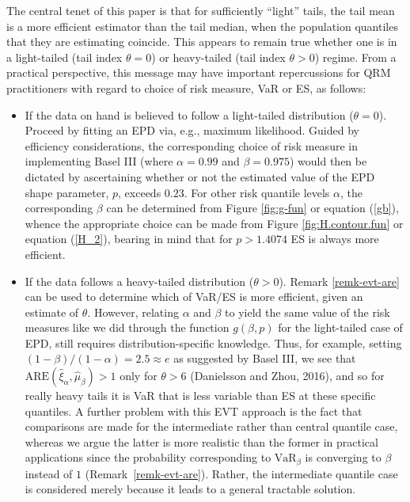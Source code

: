 \documentclass[11pt]{article}
\newcommand{\are}{{\text{ARE}}}
\newcommand{\hvaralph}{\ensuremath{\hat{\xi}_{\alpha}}}
\newcommand{\hcvar}{\ensuremath{\hat{\mu}_{\beta}}}
\newcommand{\al}{\ensuremath{\beta}}
\newcommand{\nc}{\normalcolor}
\begin{document}
The central tenet of this paper is that for sufficiently ``light''
tails, the tail mean is a more efficient estimator than the tail median, when the population
quantiles that they are estimating coincide. This appears to remain true whether
one is in a light-tailed (tail index $\theta=0$) or heavy-tailed (tail
index $\theta>0$) regime. \nc From a practical perspective, this message  may have important repercussions for QRM practitioners with regard to
choice of risk measure, VaR or ES, as follows: 
\begin{itemize}
\item If the data on hand is believed to follow a light-tailed
  distribution ($\theta=0$). Proceed by fitting an EPD via,
  e.g., maximum likelihood. Guided by efficiency considerations, the corresponding choice of risk measure in implementing
Basel III (where $\alpha=0.99$ and $\beta=0.975$) would then be
dictated by ascertaining whether or not the estimated value of the EPD shape
parameter, $p$, exceeds $0.23$. For
other risk quantile levels $\alpha$, the corresponding $\al$ can be
determined from Figure \ref{fig:g-fun} or equation (\ref{gb}), whence the appropriate choice can be made
from Figure \ref{fig:H.contour.fun} or equation (\ref{H_2}), bearing in mind that for
$p>1.4074$ ES is always more efficient. 

\item If the data follows a heavy-tailed
  distribution ($\theta>0$). Remark \ref{remk-evt-are} can
  be used to determine which of VaR/ES is more efficient, given an
  estimate of  $\theta$. However,
  relating $\alpha$ and $\beta$ to yield the same value of the risk
  measures like we
did through the function $g(\beta,p)$ for the light-tailed case of EPD, still requires distribution-specific knowledge.
Thus, for example, setting $(1-\beta)/(1-\alpha)=2.5\approx e$ as
suggested by Basel III, we see that $\are(\hvaralph,\hcvar)>1$ only for
$\theta>6$ (Danielsson and Zhou, 2016), and so for really heavy tails
it is VaR that is less variable than ES at these specific
quantiles. A further problem with this EVT approach is the fact that
comparisons are made for the intermediate rather than central quantile
case, whereas we argue the latter is more realistic than the former in
practical applications since the probability corresponding to
$\text{VaR}_\al$ is converging to $\al$ instead of $1$ (Remark~\ref{remk-evt-are}). Rather, the intermediate quantile
case is considered merely because it leads to a general tractable solution. \nc
\end{itemize}
\end{document}
